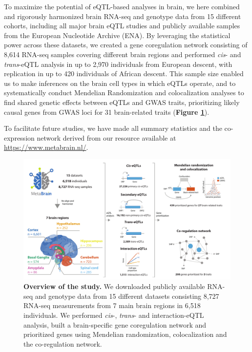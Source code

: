 To maximize the potential of eQTL-based analyses in brain, we here combined and rigorously harmonized brain RNA-seq and genotype data from 15 different cohorts, including all major brain eQTL studies and publicly available samples from the European Nucleotide Archive (ENA). By leveraging the statistical power across these datasets, we created a gene coregulation network consisting of 8,614 RNA-seq samples covering different brain regions and performed \textit{cis}- and \textit{trans}-eQTL analysis in up to 2,970 individuals from European descent, with replication in up to 420 individuals of African descent. This sample size enabled us to make inferences on the brain cell types in which eQTLs operate, and to systematically conduct Mendelian Randomization and colocalization analyses to find shared genetic effects between eQTLs and GWAS traits, prioritizing likely causal genes from GWAS loci for 31 brain-related traits (\textbf{Figure \ref{metabrain_fig1}}).   

To facilitate future studies, we have made all summary statistics and the co-expression network derived from our resource available at \url{https://www.metabrain.nl/}. 

\begin{figure}[h!]
	\includegraphics[width=\textwidth]{chapters/chapter5-brain-eqtls/img/2021-02-11-fig1-abstract_figure_v7.pdf}
	\caption{\textbf{Overview of the study.} We downloaded publicly available RNA-seq and genotype data from 15 different datasets consisting 8,727 RNA-seq measurements from 7 main brain regions in 6,518 individuals. We performed \textit{cis}-, \textit{trans}- and interaction-eQTL analysis, built a brain-specific gene coregulation network and prioritized genes using Mendelian randomization, colocalization and the co-regulation network.}
	\label{metabrain_fig1} 
\end{figure}


